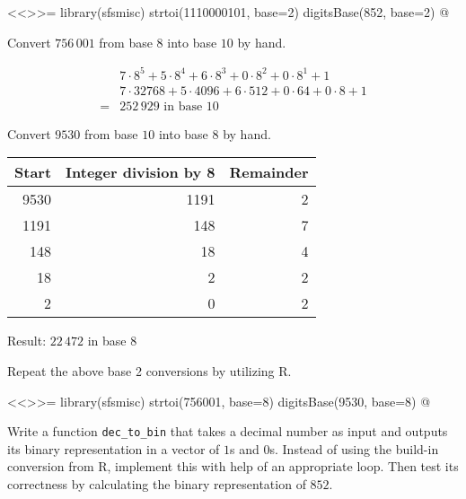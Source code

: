 \documentclass
[answers]
{exercise_sheet}
\begin{document}
\makeatletter\if@answers\begin{Answer}{3}
<<>>=
library(sfsmisc)
strtoi(1110000101, base=2) 
digitsBase(852, base=2)
@
\end{Answer}\fi\makeatother

\begin{Question}{1}
Convert $756\,001$ from base $8$ into base $10$ by hand. 
\end{Question}

\makeatletter\if@answers\begin{Answer}{3}
\begin{align*}
& 7 \cdot 8^5 + 5 \cdot 8^4 + 6 \cdot 8^3 + 0 \cdot 8^2 + 0 \cdot 8^1 + 1 \\
& 7 \cdot 32768 + 5 \cdot 4096 + 6 \cdot 512 + 0 \cdot 64 + 0 \cdot 8 + 1 \\
= & 252\,929 \text{ in base 10}
\end{align*}
\end{Answer}\fi\makeatother

\begin{Question}{1}
Convert $9530$ from base $10$ into base $8$ by hand. 
\end{Question}

\makeatletter\if@answers\begin{Answer}{8}
\begin{tabular}{rrr}
\textbf{Start} & \textbf{Integer division by 8} & \textbf{Remainder} \\ \midrule
9530 & 1191 & 2 \\
1191 & 148 & 7 \\
148 & 18 & 4 \\
18 & 2 & 2 \\
2 & 0 & 2 \\
\end{tabular}

Result: $22\,472$ in base 8
\end{Answer}\fi\makeatother

\begin{Question}{3}
Repeat the above base 2 conversions by utilizing R.  
\end{Question}

\makeatletter\if@answers\begin{Answer}{3}
<<>>=
library(sfsmisc)
strtoi(756001, base=8) 
digitsBase(9530, base=8)
@
\end{Answer}\fi\makeatother

\begin{Question}{10}
Write a function \verb|dec_to_bin| that takes a decimal number as input and outputs its binary representation in a vector of $1$s and $0$s. Instead of using the build-in conversion from R, implement this with help of an appropriate loop. Then test its correctness by calculating the binary representation of $852$.
\end{Question}
\end{document}

